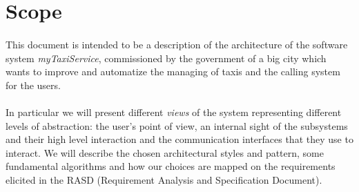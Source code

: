 \section{Scope}
\paragraph{} This document is intended to be a description of the architecture of the software system \textit{myTaxiService}, commissioned by the government of a big city which wants to improve and automatize the managing of taxis and the calling system for the users.
\paragraph{} In particular we will present different \textit{views} of the system representing different levels of abstraction: the user's point of view, an internal sight of the subsystems and their high level interaction and the communication interfaces that they use to interact. We will describe the chosen architectural styles and pattern, some fundamental algorithms and how our choices are mapped on the requirements elicited in the RASD (Requirement Analysis and Specification Document).